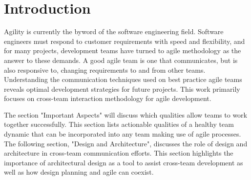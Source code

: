 \section{Introduction}
Agility is currently the byword of the software engineering field.
Software engineers must respond to customer requirements with speed and flexibility, and for many projects, development teams have turned to agile methodology as the answer to these demands.
A good agile team is one that communicates, but is also responsive to, changing requirements to and from other teams.
Understanding the communication techniques used on best practice agile teams reveals optimal development strategies for future projects.
This work primarily focuses on cross-team interaction methodology for agile development.


The section "Important Aspects" will discuss which qualities allow teams to work together successfully.
This section lists actionable qualities of a healthy team dynamic that can be incorporated into any team making use of agile processes.
The following section, "Design and Architecture", discusses the role of design and architecture in cross-team communication efforts.
This section highlights the importance of architectural design as a tool to assist cross-team development as well as how design planning and agile can coexist.
